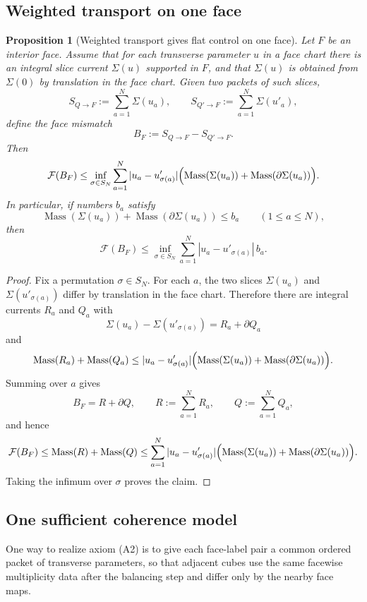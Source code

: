 \documentclass[11pt]{article}
\numberwithin{equation}{section}
\theoremstyle{plain}
\newtheorem{proposition}[theorem]{Proposition}
\theoremstyle{definition}
\theoremstyle{remark}
\DeclareMathOperator{\Mass}{Mass}
\newcommand{\calF}{\mathcal{F}}
\begin{document}
\subsection{Weighted transport on one face}

\begin{proposition}[Weighted transport gives flat control on one face]\label{prop:weighted-transport}
Let $F$ be an interior face.  Assume that for each transverse parameter $u$ in a face chart there is an integral slice current $\Sigma(u)$ supported in $F$, and that $\Sigma(u)$ is obtained from $\Sigma(0)$ by translation in the face chart.  Given two packets of such slices,
\[
S_{Q\to F}:=\sum_{a=1}^N \Sigma(u_a),
\qquad
S_{Q'\to F}:=\sum_{a=1}^N \Sigma(u'_a),
\]
define the face mismatch
\[
B_F:=S_{Q\to F}-S_{Q'\to F}.
\]
Then
\[
\calF(B_F)
\le
\inf_{\sigma\in S_N}
\sum_{a=1}^N |u_a-u'_{\sigma(a)}|\Bigl(\Mass(\Sigma(u_a))+\Mass(\partial\Sigma(u_a))\Bigr).
\]
In particular, if numbers $b_a$ satisfy
\[
\Mass(\Sigma(u_a))+\Mass(\partial\Sigma(u_a))\le b_a
\qquad (1\le a\le N),
\]
then
\[
\calF(B_F)
\le
\inf_{\sigma\in S_N}
\sum_{a=1}^N |u_a-u'_{\sigma(a)}|\,b_a.
\]
\end{proposition}

\begin{proof}
Fix a permutation $\sigma\in S_N$.  For each $a$, the two slices $\Sigma(u_a)$ and $\Sigma(u'_{\sigma(a)})$ differ by translation in the face chart.  Therefore there are integral currents $R_a$ and $Q_a$ with
\[
\Sigma(u_a)-\Sigma(u'_{\sigma(a)})=R_a+\partial Q_a
\]
and
\[
\Mass(R_a)+\Mass(Q_a)
\le |u_a-u'_{\sigma(a)}|\Bigl(\Mass(\Sigma(u_a))+\Mass(\partial\Sigma(u_a))\Bigr).
\]
Summing over $a$ gives
\[
B_F=R+\partial Q,
\qquad
R:=\sum_{a=1}^N R_a,
\qquad
Q:=\sum_{a=1}^N Q_a,
\]
and hence
\[
\calF(B_F)\le \Mass(R)+\Mass(Q)
\le
\sum_{a=1}^N |u_a-u'_{\sigma(a)}|\Bigl(\Mass(\Sigma(u_a))+\Mass(\partial\Sigma(u_a))\Bigr).
\]
Taking the infimum over $\sigma$ proves the claim.
\end{proof}

\subsection{One sufficient coherence model}

One way to realize axiom (A2) is to give each face-label pair a common ordered packet of transverse parameters, so that adjacent cubes use the same facewise multiplicity data after the balancing step and differ only by the nearby face maps.
\end{document}
